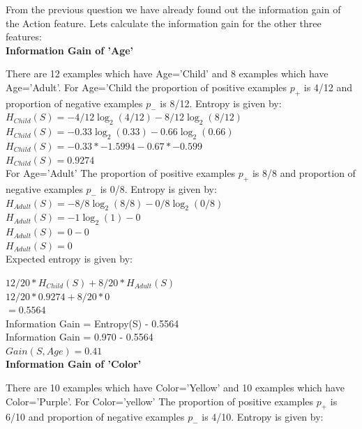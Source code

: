 \documentclass[11pt]{article}
\begin{document}
\begin{enumerate}
\begin{enumerate}
			From the previous question we have already found out the information gain of the Action feature. Lets calculate the information gain for the other three features: \\
			
			\textbf{ Information Gain of 'Age'}
			
			There are 12 examples which have Age='Child' and 8 examples which have Age='Adult'. For Age='Child the proportion of positive examples $p_+$  is 4/12 and proportion of negative examples $p_-$ is 8/12. Entropy is given by:\\
			
			$H_{Child}(S)=-4/12 \log_2{(4/12)} -8/12\log_2{(8/12)}$\\
			$H_{Child}(S)=-0.33 \log_2{(0.33)} -0.66\log_2{(0.66)}$\\
			$H_{Child}(S)=-0.33 * -1.5994  -0.67* -0.599$\\
			$H_{Child}(S)=0.9274$\\
			
			For Age='Adult' The proportion of positive examples $p_+$  is 8/8 and proportion of negative examples $p_-$ is 0/8. Entropy is given by:\\
			
			$H_{Adult}(S)=-8/8 \log_2{(8/8)} -0/8\log_2{(0/8)}$\\
			$H_{Adult}(S)=-1 \log_2{(1)} - 0 $\\
			$H_{Adult}(S)=0-0$\\
			$H_{Adult}(S)=0$\\
			
			Expected entropy is given by:
			
			$12/20 * H_{Child}(S) + 8/20 * H_{Adult}(S)$ \\
			$12/20 * 0.9274+ 8/20 * 0$ \\
			$=0.5564$\\
			
			Information Gain = Entropy(S) - 0.5564\\
			Information Gain = 0.970 - 0.5564\\
			$\boxed{Gain(S,Age)=0.41}$ \\
			
			
			\textbf{ Information Gain of 'Color'}
			
			There are 10 examples which have Color='Yellow' and 10 examples which have Color='Purple'. For Color='yellow' The proportion of positive examples $p_+$  is 6/10 and proportion of negative examples $p_-$ is 4/10. Entropy is given by:\\
			

\end{enumerate}
\end{enumerate}
\end{document}
